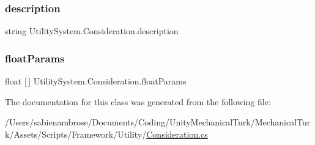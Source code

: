 \subsubsection{\texorpdfstring{description}{description}}
{\footnotesize\ttfamily string Utility\+System.\+Consideration.\+description}

\mbox{\label{class_utility_system_1_1_consideration_aab4d2dc6c9084d5684a53b2cc2c7c0c7}} 
\subsubsection{\texorpdfstring{float\+Params}{floatParams}}
{\footnotesize\ttfamily float \mbox{[}$\,$\mbox{]} Utility\+System.\+Consideration.\+float\+Params}



The documentation for this class was generated from the following file\+:\begin{DoxyCompactItemize}
\item 
/\+Users/sabienambrose/\+Documents/\+Coding/\+Unity\+Mechanical\+Turk/\+Mechanical\+Turk/\+Assets/\+Scripts/\+Framework/\+Utility/\mbox{\hyperlink{_consideration_8cs}{Consideration.\+cs}}\end{DoxyCompactItemize}
